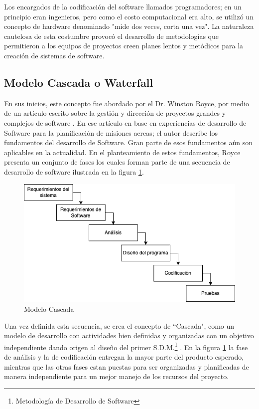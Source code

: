 Los encargados de la codificación del software llamados programadores; en un principio eran ingenieros, pero como el costo computacional era alto, se utilizó un concepto de hardware denominado "mide dos veces, corta una vez"\cite{Ganis}. La naturaleza cautelosa de esta costumbre provocó el desarrollo de metodologías que permitieron a los equipos de proyectos creen planes lentos y metódicos para la creación de sistemas de software.\\

\subsection{Modelo Cascada o Waterfall}
En sus inicios, este concepto fue abordado por el Dr. Winston Royce, por medio de un artículo escrito sobre la gestión y dirección de proyectos grandes y complejos de software \cite{Winston}. En ese artículo en base en experiencias de desarrollo de Software para la planificación de misiones aereas; el autor describe los fundamentos del desarrollo de Software. Gran parte de esos fundamentos aún son aplicables en la actualidad. En el planteamiento de estos fundamentos, Royce presenta un conjunto de fases los cuales forman parte de una secuencia de desarrollo de software ilustrada en la figura \ref{fig:cascada}.\\

\begin{figure}[H]
    \begin{center}
        \includegraphics[width=12cm]{img/capitulo_2/cascada2.png}
    \end{center}
    \caption{Modelo Cascada}
    \label{fig:cascada}
\end{figure}

Una vez definida esta secuencia, se crea el concepto de ``Cascada", como un modelo de desarrollo con actividades bien definidas y organizadas con un objetivo independiente dando origen al diseño del primer S.D.M.\footnote{Metodología de Desarrollo de Software} \cite{Bell&Thayer}. En la figura \ref{fig:cascada} la fase de análisis y la de codificación entregan la mayor parte del producto esperado, mientras que las otras fases estan puestas para ser organizadas y planificadas de manera independiente para un mejor manejo de los recursos del proyecto.\\

